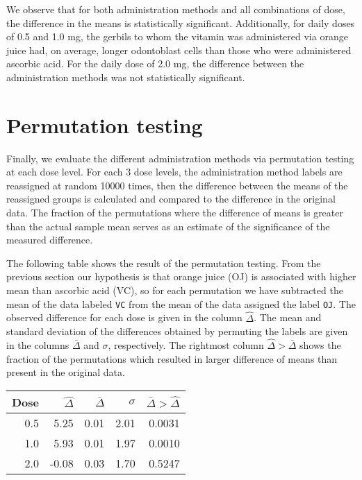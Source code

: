 \documentclass[a4paper]{article}
\begin{document}
We observe that for both administration methods and all combinations of
dose, the difference in the means is statistically significant.
Additionally, for daily doses of 0.5 and 1.0 mg, the gerbils to whom the
vitamin was administered via orange juice had, on average, longer
odontoblast cells than those who were administered ascorbic acid. For
the daily dose of 2.0 mg, the difference between the administration
methods was not statistically significant.

\section{Permutation testing}\label{permutation-testing}

Finally, we evaluate the different administration methods via
permutation testing at each dose level. For each 3 dose levels, the
administration method labels are reassigned at random 10000 times, then
the difference between the means of the reassigned groups is calculated
and compared to the difference in the original data. The fraction of the
permutations where the difference of means is greater than the actual
sample mean serves as an estimate of the significance of the measured
difference.

The following table shows the result of the permutation testing. From
the previous section our hypothesis is that orange juice (OJ) is
associated with higher mean than ascorbic acid (VC), so for each
permutation we have subtracted the mean of the data labeled \texttt{VC}
from the mean of the data assigned the label \texttt{OJ}. The observed
difference for each dose is given in the column \(\hat{\Delta}\). The
mean and standard deviation of the differences obtained by permuting the
labels are given in the columns \(\bar{\Delta}\) and \(\sigma\),
respectively. The rightmost column \(\hat{\Delta} > \bar{\Delta}\) shows
the fraction of the permutations which resulted in larger difference of
means than present in the original data.

\begin{table}[ht]
\centering
\begin{tabular}{rrrrr}
  \toprule
Dose & $\hat{\Delta}$ & $\bar{\Delta}$ & $\sigma$ & $\bar{\Delta} > \hat{\Delta}$ \\ 
  \midrule
0.5 & 5.25 & 0.01 & 2.01 & 0.0031 \\ 
  1.0 & 5.93 & 0.01 & 1.97 & 0.0010 \\ 
  2.0 & -0.08 & 0.03 & 1.70 & 0.5247 \\ 
   \bottomrule
\end{tabular}
\end{table}
\end{document}
